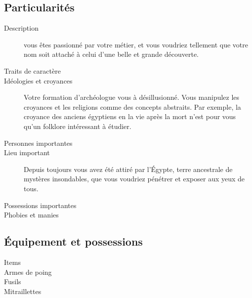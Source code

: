\documentclass[11pt]{article}
\begin{document}
\begin{twocols}
\subsection{Particularités}
\label{sec:orgfbad838}

\begin{description}
\item[{Description}] vous êtes passionné par votre métier, et vous voudriez tellement que votre nom soit attaché à celui d'une belle et grande découverte.
\item[{Traits de caractère}] 

\item[{Idéologies et croyances}] Votre formation d'archéologue vous à désillusionné. Vous manipulez les croyances et les religions comme des concepts abstraits. Par exemple, la croyance des anciens égyptiens en la vie après la mort n'est pour vous qu'un folklore intéressant à étudier.
\item[{Personnes importantes}] 

\item[{Lieu important}] Depuis toujours vous avez été attiré par l'Égypte, terre ancestrale de mystères insondables, que vous voudriez pénétrer et exposer aux yeux de tous.
\item[{Possessions importantes}] 

\item[{Phobies et manies}] 
\end{description}

\subsection{Équipement et possessions}
\label{sec:orgd394bd1}

\begin{description}
\item[{Items}] 

\item[{Armes de poing}] 

\item[{Fusils}] 

\item[{Mitraillettes}] 
\end{description}


\end{twocols}
\pagebreak
\end{document}

